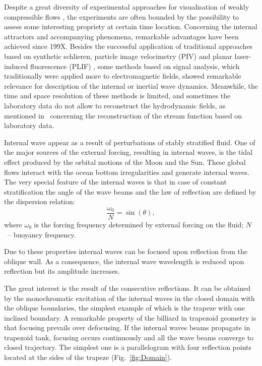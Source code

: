 \documentclass[a4wide,fontsize=12pt]{article}
\begin{document}
Despite a great diversity of experimental approaches for visualisation of weakly compressible flows \cite{znamenskaya2021methods388562176,2014SutherlandDuaxoisPeacockIWinLE}, the experiments are often bounded by the possibility to assess some interesting propriety at certain time location. Concerning the internal attractors and accompanying phenomena, remarkable advantages have been achieved since 199X. Besides the successful application of traditional approaches based on synthetic schlieren, particle image velocimetry (PIV) and planar laser-induced fluorescence (PLIF) , some methods based on signal analysis, which traditionally were applied more to electromagnetic fields, showed remarkable relevance for description of the internal or inertial wave dynamics. Meanwhile, the time and space resolution of these methods is limited, and sometimes the laboratory data do not allow to reconstruct the hydrodynamic fields, as mentioned in~\cite{2014LeePaolettiSwinneyMorrisonExperDeterIWpower} concerning the reconstruction of the stream function based on laboratory data.

Internal wave appear as a result of perturbations of stably stratified fluid. 
One of the major sources of the external forcing, resulting in internal waves, is the tidal effect produced by the orbital motions of the Moon and the Sun. These global flows interact with the ocean bottom irregularities and generate internal waves. The very special feature of the internal waves is that in case of constant stratification the angle of the wave beams and the law of reflection are defined by the dispersion relation:
$$\frac{\omega_0}{N} = \sin(\theta),$$
where $\omega_0$ is the forcing frequency determined by external forcing on the fluid; 
$N$~-- buoyancy frequency.


Due to these properties internal waves can be focused upon reflection from the oblique wall. As a consequence,  the internal wave wavelength is reduced upon reflection but its amplitude increases.


The great interest is the result of the consecutive reflections. It can be obtained by the monochromatic excitation of the internal waves in the closed domain with the oblique boundaries, the simplest example of which is the trapeze with one inclined boundary.
A remarkable property of the billiard in trapezoid geometry is that focusing prevails over defocusing.
If the internal waves beams propagate in trapezoid tank, focusing occurs continuously and all the wave beams converge to closed trajectory.  The simplest one is a parallelogram with four reflection points located at the sides of the trapeze (Fig.~\ref{fig:Domain}).
\end{document}
